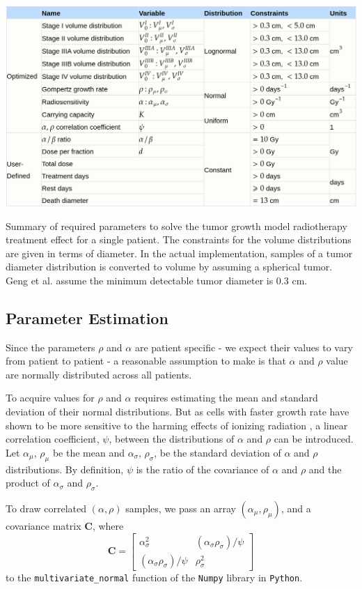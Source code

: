 \documentclass[letterpaper
, superscriptaddress
, twocolumn
, aps
]{revtex4}
\begin{document}
\begin{table}
	\includegraphics[scale=0.3]{Figures/table.png}
	\caption{Summary of required parameters to solve the tumor growth model radiotherapy treatment effect for a single patient. The constraints for the volume distributions are given in terms of diameter. In the actual implementation, samples of a tumor diameter distribution is converted to volume by assuming a spherical tumor. Geng et al. assume the minimum detectable tumor diameter is $0.3$ cm.}
	\label{table1}
\end{table}

\subsection{Parameter Estimation}

Since the parameters $\rho$ and $\alpha$ are patient specific - we expect their values to vary from patient to patient - a reasonable assumption to make is that $\alpha$ and $\rho$ value are normally distributed across all patients.

To acquire values for $\rho$ and $\alpha$ requires estimating the mean and standard deviation of their normal distributions. But as cells with faster growth rate have shown to be more sensitive to the harming effects of ionizing radiation \cite{Geng2017}, a linear correlation coefficient, $\psi$, between the distributions of $\alpha$ and $\rho$ can be introduced. Let $\alpha_{\mu}$, $\rho_{\mu}$ be the mean and $\alpha_{\sigma}$, $\rho_{\sigma}$, be the standard deviation of $\alpha$ and $\rho$ distributions. By definition, $\psi$ is the ratio of the covariance of $\alpha$ and $\rho$ and the product of $\alpha_{\sigma}$ and $\rho_{\sigma}$.

To draw correlated $(\alpha, \rho)$ samples, we pass an array $(\alpha_{\mu}, \rho_{\mu})$, and a covariance matrix $\mathbf{C}$, where
\begin{equation*}
\mathbf{C} = 
\begin{bmatrix}
\alpha_{\sigma}^{2} & \left(\alpha_{\sigma}\rho_{\sigma}\right)/\psi\\
\left(\alpha_{\sigma}\rho_{\sigma}\right)/\psi & \rho_{\sigma}^{2}
\end{bmatrix}
\end{equation*}
to the \texttt{multivariate\_normal} function of the \texttt{Numpy} library in \texttt{Python}. 
\end{document}
